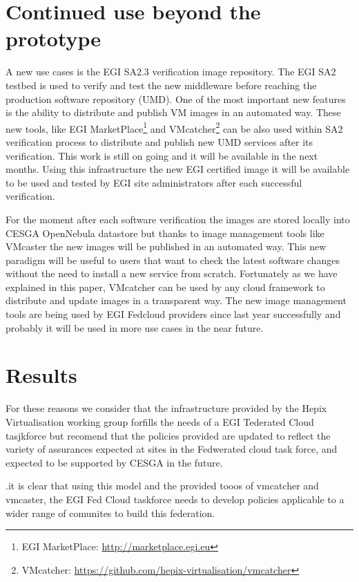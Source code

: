 \documentclass{llncs_Ibergrid2013}
\begin{document}
\section{Continued use beyond the prototype}
\label{sect-experiances}


A new use cases is the EGI SA2.3 verification image repository. The EGI SA2 testbed is used to verify and test the new middleware before reaching the production software repository (UMD).
One of the most important new features is the ability to distribute and publish VM images in an automated way. 
These new tools, like EGI MarketPlace\footnote{EGI MarketPlace: \url{http://marketplace.egi.eu}} and VMcatcher\footnote{VMcatcher: \url{https://github.com/hepix-virtualisation/vmcatcher}} can be also used within SA2 verification process to distribute and publish new UMD services after its verification. 
This work is still on going and it will be available in the next months. Using this infrastructure the new EGI certified image it will be available to be used and tested by EGI site administrators after each successful verification.

For the moment after each software verification the images are stored locally into CESGA OpenNebula datastore but thanks to image management tools like VMcaster the new images will be published in an automated way.
This new paradigm will be useful to users that want to check the latest software changes without the need to install a new service from scratch.
Fortunately as we have explained in this paper, VMcatcher can be used by any cloud framework to distribute and update images in a transparent way. 
The new image management tools are being used by EGI Fedcloud providers since last year successfully and probably it will be used in more use cases in the near future.


\section{Results}
\label{sect-results}

For these reasons we consider that the infrastructure provided by the Hepix Virtualisation working group forfills the needs of a EGI Tederated Cloud tasjkforce but recomend that the policies provided are updated to reflect the variety of assurances expected at sites in the Fedwerated cloud task force, and expected to be supported by CESGA in the future.

.it is clear that using this model and the provided tooos of vmcatcher and vmcaster, the EGI Fed Cloud taskforce needs to develop policies applicable to a wider range of comunites to build this federation.
\end{document}
